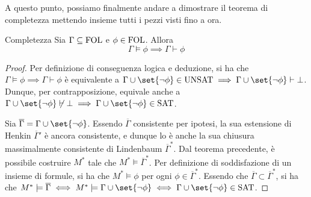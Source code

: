 A questo punto, possiamo finalmente andare a dimostrare il teorema di completezza mettendo insieme tutti i pezzi visti fino a ora.

\begin{theorem}{Completezza}
  Sia \(\Gamma \subseteq \FOL\) e \(\phi \in \FOL\). Allora
  \[\Gamma \models \phi \implies \Gamma \vdash \phi\]
\end{theorem}

\begin{proof}
  Per definizione di conseguenza logica e deduzione, si ha che \(\Gamma \models \phi \implies \Gamma \vdash \phi\) è equivalente a \(\Gamma \cup \set{\neg \phi} \in \Unsat \implies \Gamma \cup \set{\neg \phi} \vdash \bot\). Dunque, per contrapposizione, equivale anche a \(\Gamma \cup \set{\neg \phi} \not\vdash \bot \implies \Gamma \cup \set{\neg \phi} \in \Sat\).

  Sia \(\overline{\Gamma} = \Gamma \cup \set{\neg \phi}\). Essendo \(\overline{\Gamma}\) consistente per ipotesi, la sua estensione di Henkin \(\overline{\Gamma}'\) è ancora consistente, e dunque lo è anche la sua chiusura massimalmente consistente di Lindenbaum \(\overline{\Gamma}^*\). Dal teorema precedente, è possibile costruire \(M^*\) tale che \(M^* \models \overline{\Gamma}^*\). Per definizione di soddisfazione di un insieme di formule, si ha che \(M^* \models \phi\) per ogni \(\phi \in \overline{\Gamma}^*\). Essendo che \(\overline{\Gamma}\subset\overline{\Gamma}^*\), si ha che \(M^* \models \overline{\Gamma} \iff M^* \models \Gamma \cup \set{\neg \phi} \iff \Gamma \cup \set{\neg \phi} \in \Sat\).

\end{proof}